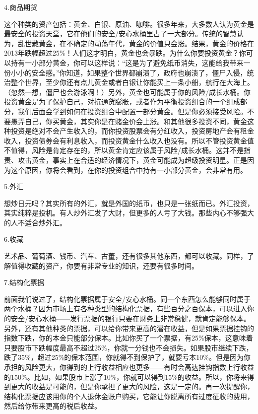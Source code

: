 4.商品期货

这个种类的资产包括：黄金、白银、原油、咖啡。很多年来，大多数人认为黄金是最安全的投资天堂，它在他们的安全/安心水桶里占了一大部分。传统的智慧认为，乱世藏黄金，在不确定的动荡年代，黄金的价值只会涨。结果，黄金的价格在2013年跌幅超过25\%！人们这才明白，黄金也会暴跌。为什么你要投资黄金？你可以持有一小部分黄金，你可以这样说：“这是为了避免纸币消失，这能给我带来一份小小的安全感。”你知道，如果整个世界都崩溃了，政府也崩溃了，僵尸入侵，统治整个世界，至少你还有点儿黄金或者白银让你能买上一条小船，航行在大海上。（忽然一想，僵尸也会游泳啊！）另外，黄金也可能属于你的风险/成长水桶。你投资黄金是为了保护自己，对抗通货膨胀，或者作为平衡投资组合的一个组成部分，我们后面会学到如何在投资组合中配置一部分黄金。但是你必须接受风险。不要愚弄自己，你买黄金，其实你是在赌金价会上涨。和其他很多投资不同，黄金这种投资是绝对不会产生收入的，而你投资股票会有分红收入，投资房地产会有租金收入，投资债券会有利息收入，而投资黄金什么收入也没有。所以不管投资黄金值不值得，风险是肯定存在的，所以黄金肯定应该属于风险/成长水桶。这并不是指责、攻击黄金，事实上在合适的经济情况下，黄金可能成为超级投资明星。正是因为这个原因，你将会看到，在你的投资组合中持有一小部分黄金，会非常有用。

5.外汇

想炒日元吗？其实所有的外汇，就是外国的纸币，也只是一张纸而已。外汇投资，其实纯粹是投机。有人炒外汇发了大财，但更多的人亏了大钱。那些内心不够强大的人不适合炒外汇。

6.收藏

艺术品、葡萄酒、钱币、汽车、古董，还有很多其他东西，都可以收藏。同样，了解值得收藏的资产，你要有非常专业的知识，还要有很多时间。

7.结构化票据

前面我们说过了，结构化票据属于安全/安心水桶。同一个东西怎么能够同时属于两个水桶？因为市场上有各种类型的结构化票据，有些百分之百保本，可以进入你的安全/安心水桶——发行票据的银行只要在财务上非常稳健，就肯定能够保本。另外，还有其他种类的票据，可以给你带来更高的潜在收益，但是如果票据挂钩的指数下跌，你的本金只能部分保本。比如你买了一个票据，有25\%保本，这意味着只要股市下跌幅度最高不超过25\%，你就一分钱也不会损失。如果股市继续下跌，跌了35\%，超过25\%的保本范围，你就得不到保护了，就要亏本10\%。但是因为你承担的风险更大，你得到的上行收益相应也更多——有时会高达挂钩指数上行收益的150\%。比如，如果股市上涨了10\%，你就可以得到15\%的收益。所以，你将来得到更大的收益是可能的，但是你承担了更大的风险，这是一定的。再一次提醒你，结构化票据应该用你的个人退休金账户购买，它能让你脱离所有过度征收的费用，然后给你带来更高的税后收益。

